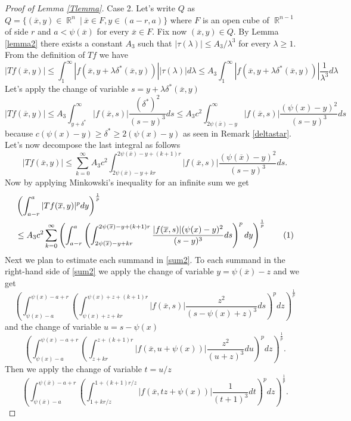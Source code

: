 \documentclass[12pt]{article}
\theoremstyle{definition}
\DeclareMathOperator\rr{\mathbb{R}}
\newcommand\addtag{\refstepcounter{equation}\tag{\theequation}}
\begin{document}
\begin{proof}[Proof of Lemma \ref{Tlemma}]
Case 2. Let's write $Q$ as $Q=\{ (\overline x,y) \in \rr^n \ | \ \overline x \in F, y \in (a-r,a) \}$ where $F$ is an open cube of $\rr^{n-1}$ of side $r$ and $a<\psi(\overline x)$ for every $\overline x \in F$. Fix now $(\overline x, y) \in Q$. By Lemma \ref{lemma2} there exists a constant $A_3$ such that $|\tau(\lambda)|\le A_3/\lambda^3$  for every $\lambda \ge 1.$ From the definition of $Tf$ we have
\begin{equation} |Tf(\overline x,y)| \le\int_1^\infty |f(\overline x, y+\lambda \delta^*(\overline x,y))||\tau(\lambda)|d\lambda \le A_3 \int_1^\infty |f(\overline x, y+\lambda \delta^*(\overline x,y))|\frac{1}{\lambda^3}d\lambda \label{bullet1}
\end{equation}
Let's apply the change of variable $s=y+\lambda \delta^*(\overline x,y)$
\begin{equation}  |Tf(\overline x,y)|\le A_3\int_{y+\delta^*}^\infty |f(\overline x, s)|\frac{(\delta^*)^2}{(s-y)^3}ds\le A_3 c^2 \int_{2\psi(\overline x)-y}^\infty |f(\overline x, s)|\frac{(\psi(x)-y)^2}{(s-y)^3}ds \label{bullet2}
\end{equation} 
because $c(\psi(x)-y)\ge\delta^*\ge 2(\psi(x)-y)$ as seen in Remark \ref{deltastar}. Let's now decompose the last integral as follows
\[ |Tf(\overline x,y)|\le \sum_{k=0}^\infty A_3c^2\int_{2\psi(\overline x)-y+kr}^{2\psi(\overline x)-y+(k+1)r} |f(\overline x, s)|\frac{(\psi(\overline x)-y)^2}{(s-y)^3}ds.\]
Now by applying Minkowski's inequality for an infinite sum we get
\begin{align*} &\left(\int_{a-r}^{a}|Tf(\overline x,y)|^p dy\right)^{\frac{1}{p}} \\
&\le A_3 c^2\sum_{k=0}^\infty \left( \int_{a-r}^{a}\left ( \int_{2\psi(\overline x)-y+kr}^{2\psi(\overline x)-y+(k+1)r} \frac{|f(\overline x, s)|(\psi(x)-y)^2}{(s-y)^3}ds\right)^pdy \right)^{\frac{1}{p}} \addtag \label{sum2} 
\end{align*}
Next we plan to estimate each summand in \eqref{sum2}. To each summand in the right-hand side of \eqref{sum2} we apply the change of variable $y=\psi(\overline x)-z$ and we get
\[ \left( \int_{\psi(x)-a}^{\psi(x)-a+r}\left (\int_{\psi(x)+z+kr}^{\psi(x)+z+(k+1)r} |f(\overline x, s)|\frac{z^2}{(s-\psi(x)+z)^3}ds\right)^pdz \right)^{\frac{1}{p}}\]
and the change of variable $u=s-\psi(x)$
\[ \left( \int_{\psi(x)-a}^{\psi(x)-a+r}\left (\int_{z+kr}^{z+(k+1)r} |f(\overline x, u+\psi(x))|\frac{z^2}{(u+z)^3}du\right)^pdz \right)^{\frac{1}{p}}.\]
Then we apply the change of variable $t=u/z$
\[ \left( \int_{\psi(\overline x) - a}^{\psi(\overline x) -a+r}\left (\int_{1+kr/z}^{1+(k+1)r/z} |f(\overline x, tz+\psi(x))|\frac{1}{(t+1)^3}dt\right)^pdz \right)^{\frac{1}{p}}.\]

\end{proof}
\end{document}
